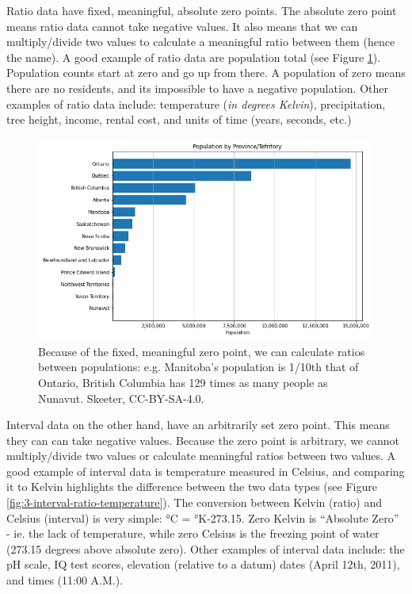\documentclass[
]{book}
\begin{document}
Ratio data have fixed, meaningful, absolute zero points. The absolute zero point means ratio data cannot take negative values. It also means that we can multiply/divide two values to calculate a meaningful ratio between them (hence the name). A good example of ratio data are population total (see Figure \ref{fig:3-ratio-population}). Population counts start at zero and go up from there. A population of zero means there are no residents, and its impossible to have a negative population. Other examples of ratio data include: temperature (\emph{in degrees Kelvin}), precipitation, tree height, income, rental cost, and units of time (years, seconds, etc.)

\begin{figure}
\includegraphics[width=0.75\linewidth]{images/03-ratio-population} \caption{Because of the fixed, meaningful zero point, we can calculate ratios between populations: e.g. Manitoba's population is 1/10th that of Ontario, British Columbia has 129 times as many people as Nunavut. Skeeter, CC-BY-SA-4.0.}\label{fig:3-ratio-population}
\end{figure}

Interval data on the other hand, have an arbitrarily set zero point. This means they can can take negative values. Because the zero point is arbitrary, we cannot multiply/divide two values or calculate meaningful ratios between two values. A good example of interval data is temperature measured in Celsius, and comparing it to Kelvin highlights the difference between the two data types (see Figure \ref{fig:3-interval-ratio-temperature}). The conversion between Kelvin (ratio) and Celsius (interval) is very simple: °C = °K-273.15. Zero Kelvin is ``Absolute Zero'' - ie. the lack of temperature, while zero Celsius is the freezing point of water (273.15 degrees above absolute zero). Other examples of interval data include: the pH scale, IQ test scores, elevation (relative to a datum) dates (April 12th, 2011), and times (11:00 A.M.).
\end{document}
